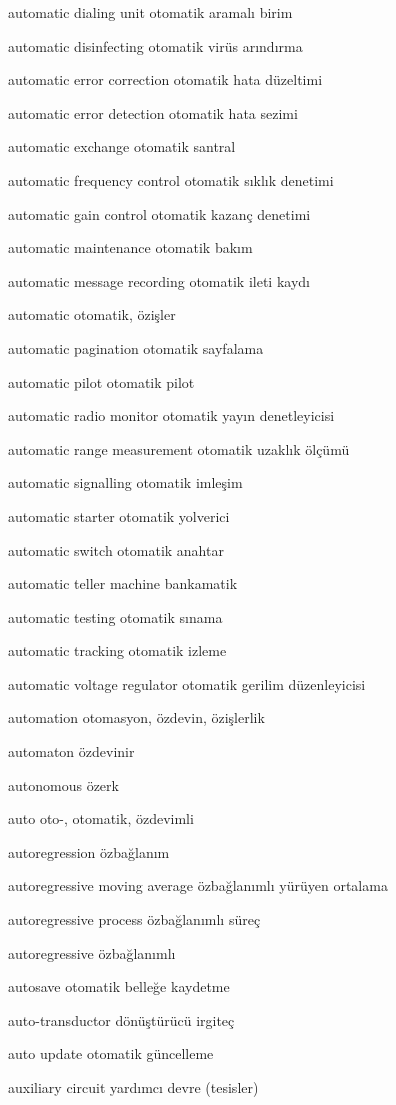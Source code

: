 \documentclass[12pt,fleqn]{article}\usepackage{../../common}
\begin{document}
automatic dialing unit otomatik aramalı birim

automatic disinfecting otomatik virüs arındırma

automatic error correction otomatik hata düzeltimi

automatic error detection otomatik hata sezimi

automatic exchange otomatik santral

automatic frequency control otomatik sıklık denetimi

automatic gain control otomatik kazanç denetimi

automatic maintenance otomatik bakım

automatic message recording otomatik ileti kaydı

automatic otomatik, özişler

automatic pagination otomatik sayfalama

automatic pilot otomatik pilot

automatic radio monitor otomatik yayın denetleyicisi

automatic range measurement otomatik uzaklık ölçümü

automatic signalling otomatik imleşim

automatic starter otomatik yolverici

automatic switch otomatik anahtar

automatic teller machine bankamatik

automatic testing otomatik sınama

automatic tracking otomatik izleme

automatic voltage regulator otomatik gerilim düzenleyicisi

automation otomasyon, özdevin, özişlerlik

automaton özdevinir

autonomous özerk

auto oto-, otomatik, özdevimli

autoregression özbağlanım

autoregressive moving average özbağlanımlı yürüyen ortalama

autoregressive process özbağlanımlı süreç

autoregressive özbağlanımlı

autosave otomatik belleğe kaydetme

auto-transductor dönüştürücü irgiteç

auto update otomatik güncelleme

auxiliary circuit yardımcı devre (tesisler)
\end{document}
